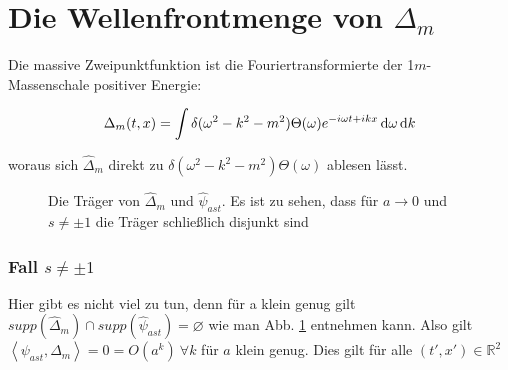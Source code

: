 
\section{Die Wellenfrontmenge von $\Delta_m$} %
\label{sec:die_wellenfrontmenge_von_delta_m}

Die massive Zweipunktfunktion ist die Fouriertransformierte der 1$m$-Massenschale positiver Energie:

\begin{equation}
    \Delta_m (t,x) = \int \delta (\omega^2-k^2-m^2)
                    \Theta(\omega)e^{-i\omega t + i k x} \mathop{}\!\mathrm{d} \omega \mathop{}\!\mathrm{d} k
\end{equation}

woraus sich $\hat \Delta_m$ direkt zu $\delta (\omega^2-k^2-m^2)\Theta(\omega)$
ablesen lässt.

\begin{figure}[h]
\centering

\caption{Die Träger von $\hat\Delta_m$ und $\hat\psi_{ast}$. Es ist zu sehen, dass für $a \rightarrow 0$ und $s \neq \pm 1$ die Träger schließlich disjunkt sind}
\label{fig:delta_m}
\end{figure}

\subsubsection*{Fall $s \neq \pm 1$}
Hier gibt es nicht viel zu tun, denn für a klein genug gilt
$supp (\hat \Delta_m) \cap supp (\hat \psi_{ast}) = \varnothing$ wie man Abb. \ref{fig:delta_m} entnehmen kann.
Also gilt $\left< \psi_{ast}, \Delta_m\right> = 0 = O(a^k)~ \forall k$ für $a$ klein genug. Dies gilt für alle $(t', x') \in \mathbb{R}^2$


